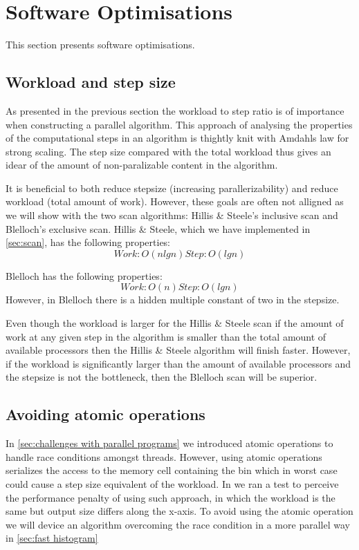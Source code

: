 \section{Software Optimisations}
\label{sec:software optimisations}

This section presents software optimisations.

\subsection{Workload and step size}
\label{sec:workload and step size}
As presented in the previous section the workload to step ratio is of importance when constructing a parallel algorithm.
This approach of analysing the properties of the computational steps in an algorithm is thightly knit with Amdahls law for strong scaling.
The step size compared with the total workload thus gives an idear of the amount of non-paralizable content in the algorithm.

It is beneficial to both reduce stepsize (increasing parallerizability) and reduce workload (total amount of work).
However, these goals are often not alligned as we will show with the two scan algorithms: Hillis \& Steele's inclusive scan and Blelloch's exclusive scan.
Hillis \& Steele, which we have implemented in \cref{sec:scan}, has the following properties:
\begin{equation*}
Work: O(n lg n)
Step: O(lg n)
\end{equation*}

Blelloch has the following properties:
\begin{equation*}
Work: O(n)
Step: O(lg n)
\end{equation*}
However, in Blelloch there is a hidden multiple constant of two in the stepsize.

Even though the workload is larger for the Hillis \& Steele scan if the amount of work at any given step in the algorithm is smaller than the total amount of available processors then the Hillis \& Steele algorithm will finish faster.
However, if the workload is significantly larger than the amount of available processors and the stepsize is not the bottleneck, then the Blelloch scan will be superior.

\subsection{Avoiding atomic operations}
In \cref{sec:challenges with parallel programs} we introduced atomic operations to handle race conditions amongst threads.
However, using atomic operations serializes the access to the memory cell containing the bin which in worst case could cause a step size equivalent of the workload.
In  we ran a test to perceive the performance penalty of using such approach, in which the workload is the same but output size differs along the x-axis.
To avoid using the atomic operation we will device an algorithm overcoming the race condition in a more parallel way in \cref{sec:fast histogram}
